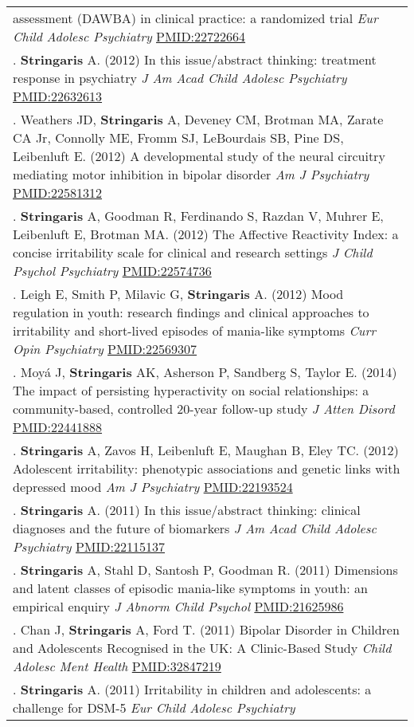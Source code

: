 \documentclass[
]{article}
\begin{document}
\begin{longtable}[]{@{}
  >{\raggedright\arraybackslash}p{}@{}}
assessment (DAWBA) in clinical practice: a randomized trial \emph{Eur
Child Adolesc Psychiatry} \url{PMID:22722664} \\
175. \textbf{Stringaris} A. (2012) In this issue/abstract thinking:
treatment response in psychiatry \emph{J Am Acad Child Adolesc
Psychiatry} \url{PMID:22632613} \\
176. Weathers JD, \textbf{Stringaris} A, Deveney CM, Brotman MA, Zarate
CA Jr, Connolly ME, Fromm SJ, LeBourdais SB, Pine DS, Leibenluft E.
(2012) A developmental study of the neural circuitry mediating motor
inhibition in bipolar disorder \emph{Am J Psychiatry}
\url{PMID:22581312} \\
177. \textbf{Stringaris} A, Goodman R, Ferdinando S, Razdan V, Muhrer E,
Leibenluft E, Brotman MA. (2012) The Affective Reactivity Index: a
concise irritability scale for clinical and research settings \emph{J
Child Psychol Psychiatry} \url{PMID:22574736} \\
178. Leigh E, Smith P, Milavic G, \textbf{Stringaris} A. (2012) Mood
regulation in youth: research findings and clinical approaches to
irritability and short-lived episodes of mania-like symptoms \emph{Curr
Opin Psychiatry} \url{PMID:22569307} \\
179. Moyá J, \textbf{Stringaris} AK, Asherson P, Sandberg S, Taylor E.
(2014) The impact of persisting hyperactivity on social relationships: a
community-based, controlled 20-year follow-up study \emph{J Atten
Disord} \url{PMID:22441888} \\
180. \textbf{Stringaris} A, Zavos H, Leibenluft E, Maughan B, Eley TC.
(2012) Adolescent irritability: phenotypic associations and genetic
links with depressed mood \emph{Am J Psychiatry} \url{PMID:22193524} \\
181. \textbf{Stringaris} A. (2011) In this issue/abstract thinking:
clinical diagnoses and the future of biomarkers \emph{J Am Acad Child
Adolesc Psychiatry} \url{PMID:22115137} \\
182. \textbf{Stringaris} A, Stahl D, Santosh P, Goodman R. (2011)
Dimensions and latent classes of episodic mania-like symptoms in youth:
an empirical enquiry \emph{J Abnorm Child Psychol}
\url{PMID:21625986} \\
183. Chan J, \textbf{Stringaris} A, Ford T. (2011) Bipolar Disorder in
Children and Adolescents Recognised in the UK: A Clinic-Based Study
\emph{Child Adolesc Ment Health} \url{PMID:32847219} \\
184. \textbf{Stringaris} A. (2011) Irritability in children and
adolescents: a challenge for DSM-5 \emph{Eur Child Adolesc Psychiatry}

\end{longtable}
\end{document}
